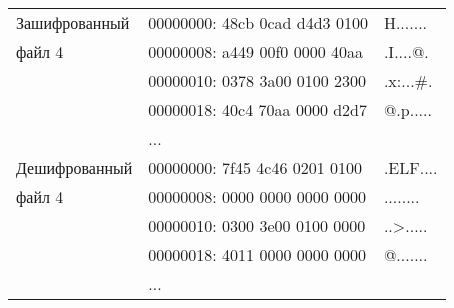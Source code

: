 \begin{table}[ht!]
\begin{center}
\begin{tabular}{|l|ll|}
            Зашифрованный & 00000000: 48cb 0cad d4d3 0100 & H....... \\
            файл 4        & 00000008: a449 00f0 0000 40aa & .I....@. \\
                          & 00000010: 0378 3a00 0100 2300 & .x:...\#. \\
                          & 00000018: 40c4 70aa 0000 d2d7 & @.p..... \\
                          & ... & \\
            \hline
            Дешифрованный & 00000000: 7f45 4c46 0201 0100 & .ELF.... \\
            файл 4        & 00000008: 0000 0000 0000 0000 & ........ \\
                          & 00000010: 0300 3e00 0100 0000 & ..>..... \\
                          & 00000018: 4011 0000 0000 0000 & @....... \\
                          & ... & \\
            \hline
        \end{tabular}
    \end{center}
\end{table}

\clearpage